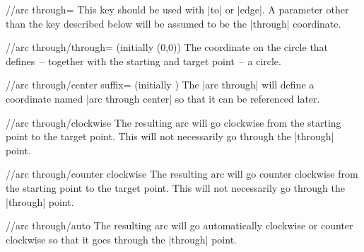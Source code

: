 \begin{multicols}{2}
\begin{key}{/\tikzext/arc through=}
  This key should be used with |to| or |edge|.
  A parameter other than the key described below will
  be assumed to be the |through| coordinate.
\end{key}

\begin{key}{/\tikzext/arc through/through= (initially {(0,0)})}
  The coordinate on the circle that defines~-- together with the
  starting and target point~-- a circle.
\end{key}

\begin{key}{/\tikzext/arc through/center suffix= (initially {})}
  The |arc through| will define a coordinate named |arc through center|
  so that it can be referenced later.
\end{key}

\begin{key}{/\tikzext/arc through/clockwise}
  The resulting arc will go clockwise from the starting point to the target point.
  This will not necessarily go through the |through| point.
\end{key}

\begin{key}{/\tikzext/arc through/counter clockwise}
  The resulting arc will go counter clockwise from the starting point to the target point.
  This will not necessarily go through the |through| point.
\end{key}

\begin{key}{/\tikzext/arc through/auto}
  The resulting arc will go automatically clockwise or counter clockwise
  so that it goes through the |through| point.
\end{key}
\end{multicols}
\endinput